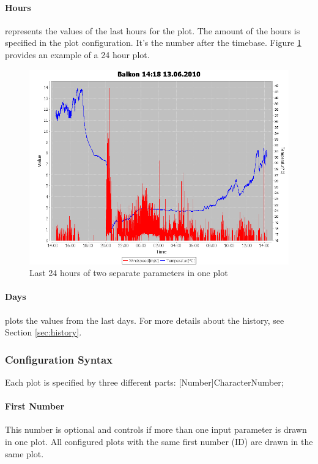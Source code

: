 \paragraph{Hours} %
\label{par:hours}
represents the values of the last hours for the plot. The amount of the hours is specified in the plot configuration. It's the number after the timebase. Figure \ref{fig:hours} provides an example of a 24 hour plot.
\begin{figure}[ht]
    \centering
    \includegraphics[width=0.9\linewidth]{master/plot_exampleh.png}
    \caption{Last 24 hours of two separate parameters in one plot}
    \label{fig:hours}
\end{figure}

\paragraph{Days} %
\label{par:days}
plots the values from the last days. For more details about the history, see Section \ref{sec:history}.

\subsubsection{Configuration Syntax} %
\label{ssub:configuration_syntax}
Each plot is specified by three different parts: [Number]CharacterNumber;

\paragraph{First Number} %
\label{par:first_number_id}
This number is optional and controls if more than one input parameter is drawn in one plot. All configured plots with the same first number (ID) are drawn in the same plot.
